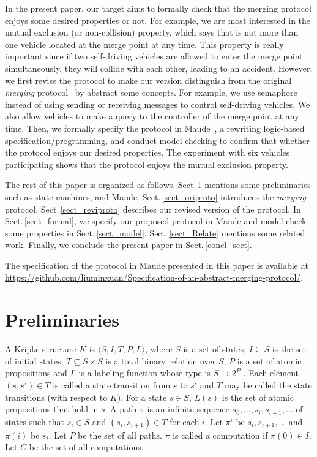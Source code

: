 \documentclass[10pt, conference, compsocconf]{IEEEtran}
\begin{document}
In the present paper, our target aims to formally check that the merging protocol enjoys some desired properties or not. For example, we are most interested in the mutual exclusion (or non-collision) property, which says that is not more than one vehicle located at the merge point at any time.
This property is really important since if two self-driving vehicles are allowed to enter the merge point simultaneously, they will collide with each other, leading to an accident.
However, we first revise the protocol to make our version distinguish from the original \textit{merging} protocol~\cite{10.1145/3055004.3055028} by abstract some concepts.
For example, we use semaphore instead of using sending or receiving messages to control self-driving vehicles. 
We also allow vehicles to make a query to the controller of the merge point at any time.
Then, we formally specify the protocol in Maude~\cite{Clavel2007LNCS}, a rewriting logic-based specification/programming, and conduct model checking to confirm that whether the protocol enjoys our desired properties.
The experiment with six vehicles participating shows that the protocol enjoys the mutual exclusion property.

The rest of this paper is organized as follows. Sect.\,\ref{sect_Prel}
mentions some preliminaries such as state machines, and Maude.
Sect.\,\ref{sect_oriproto} introduces the \textit{merging} protocol.
Sect.\,\ref{sect_reviproto} describes our revised version of the protocol.
In Sect.\,\ref{sect_formal}, we specify our proposed protocol in Maude and model check some properties in Sect.\,\ref{sect_model}.
Sect.\,\ref{sect_Relate} mentions some related work.
Finally, we conclude the present paper in Sect.\,\ref{concl_sect}.

The specification of the protocol in Maude presented in this
paper is available at \url{https://github.com/liuminxuan/Specification-of-an-abstract-merging-protocol/}.


\section{Preliminaries}
 \label{sect_Prel}
 
 
A Kripke structure $K$ is $\langle S,I,T,P,L \rangle$, where $S$ is a set
of states, $I \subseteq S$ is the set of initial states, $T \subseteq S \times S$
is a total binary relation over $S$, $P$ is a set of atomic
propositions and $L$ is a labeling function whose type is
$S \rightarrow 2^P$ . Each element $(s, s') \in T$ is called a state transition
from $s$ to $s'$ and $T$ may be called the state transitions
(with respect to $K$). For a state $s \in S$, $L(s)$ is the set
of atomic propositions that hold in $s$. A path $\pi$ is an infinite
sequence $s_0, \ldots , s_i, s_{i+1}, \ldots$ of states such that $s_i \in S$ and
$(s_i, s_{i+1}) \in T$ for each $i$. Let $\pi^i$ be $s_i, s_{i+1}, \ldots$ and $\pi(i)$ be
$s_i$. Let $P$ be the set of all paths. $\pi$ is called a computation
if $\pi(0) \in I$. Let $C$ be the set of all computations.
\end{document}
